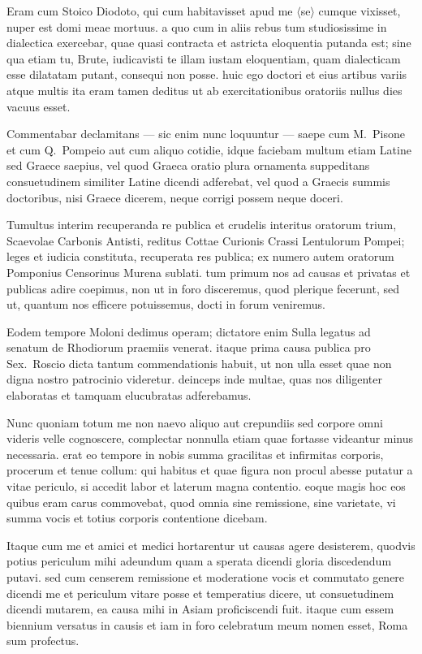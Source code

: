 Eram cum Stoico Diodoto, qui cum habitavisset apud me $\langle$se$\rangle$ cumque vixisset, nuper est domi meae mortuus. a quo cum in aliis rebus tum studiosissime in dialectica exercebar, quae quasi contracta et astricta eloquentia putanda est; sine qua etiam tu, Brute, iudicavisti te illam iustam eloquentiam, quam dialecticam esse dilatatam putant, consequi non posse. huic ego doctori et eius artibus variis atque multis ita eram tamen deditus ut ab exercitationibus oratoriis nullus dies vacuus esset.

Commentabar declamitans — sic enim nunc loquuntur — saepe cum M.~Pisone et cum Q.~Pompeio aut cum aliquo cotidie, idque faciebam multum etiam Latine sed Graece saepius, vel quod Graeca oratio plura ornamenta suppeditans consuetudinem similiter Latine dicendi adferebat, vel quod a Graecis summis doctoribus, nisi Graece dicerem, neque corrigi possem neque doceri.

Tumultus interim recuperanda re publica et crudelis interitus oratorum trium, Scaevolae Carbonis Antisti, reditus Cottae Curionis Crassi Lentulorum Pompei; leges et iudicia constituta, recuperata res publica; ex numero autem oratorum Pomponius Censorinus Murena sublati. tum primum nos ad causas et privatas et publicas adire coepimus, non ut in foro disceremus, quod plerique fecerunt, sed ut, quantum nos efficere potuissemus, docti in forum veniremus.

Eodem tempore Moloni dedimus operam; dictatore enim Sulla legatus ad senatum de Rhodiorum praemiis venerat. itaque prima causa publica pro Sex.~Roscio dicta tantum commendationis habuit, ut non ulla esset quae non digna nostro patrocinio videretur. deinceps inde multae, quas nos diligenter elaboratas et tamquam elucubratas adferebamus.

Nunc quoniam totum me non naevo aliquo aut crepundiis sed corpore omni videris velle cognoscere, complectar nonnulla etiam quae fortasse videantur minus necessaria. erat eo tempore in nobis summa gracilitas et infirmitas corporis, procerum et tenue collum: qui habitus et quae figura non procul abesse putatur a vitae periculo, si accedit labor et laterum magna contentio. eoque magis hoc eos quibus eram carus commovebat, quod omnia sine remissione, sine varietate, vi summa vocis et totius corporis contentione dicebam.

Itaque cum me et amici et medici hortarentur ut causas agere desisterem, quodvis potius periculum mihi adeundum quam a sperata dicendi gloria discedendum putavi. sed cum censerem remissione et moderatione vocis et commutato genere dicendi me et periculum vitare posse et temperatius dicere, ut consuetudinem dicendi mutarem, ea causa mihi in Asiam proficiscendi fuit. itaque cum essem biennium versatus in causis et iam in foro celebratum meum nomen esset, Roma sum profectus.

